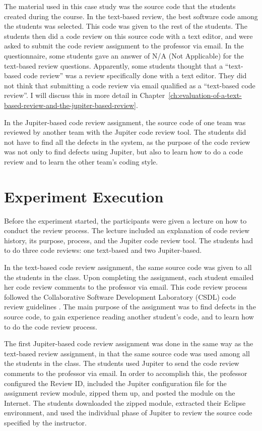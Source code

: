 The material used in this case study was the source code that the students created during the course. In the text-based review, the best software code among the students was selected. This code was given to the rest of the students. The students then did a code review on this source code with a text editor, and were asked to submit the code review assignment to the professor via email. In the questionnaire, some students gave an answer of N/A (Not Applicable) for the text-based review questions. Apparently, some students thought that a ``text-based code review'' was a review specifically done with a text editor.  They did not think that submitting a code review via email qualified as a ``text-based code review''. I will discuss this in more detail in Chapter~\ref{ch:evaluation-of-a-text-based-review-and-the-jupiter-based-review}.

In the Jupiter-based code review assignment, the source code of one team was reviewed by another team with the Jupiter code review tool. The students did not have to find all the defects in the system, as the purpose of the code review was not only to find defects using Jupiter, but also to learn how to do a code review and to learn the other team's coding style.

\section{Experiment Execution}
\label{sec:experiment-execution}

Before the experiment started, the participants were given a lecture on how to conduct the review process. The lecture included an explanation of code review history, its purpose, process, and the Jupiter code review tool. The students had to do three code reviews: one text-based and two Jupiter-based.

In the text-based code review assignment, the same source code was given to all the students in the class. Upon completing the assignment, each student emailed her code review comments to the professor via email. This code review process followed the Collaborative Software Development Laboratory (CSDL) code review guidelines \cite{wiegers:seven}. The main purpose of the assignment was to find defects in the source code, to gain experience reading another student's code, and to learn how to do the code review process.

The first Jupiter-based code review assignment was done in the same way as the text-based review assignment, in that the same source code was used among all the students in the class. The students used Jupiter to send the code review comments to the professor via email. In order to accomplish this, the professor configured the Review ID, included the Jupiter configuration file for the assignment review module, zipped them up, and posted the module on the Internet. The students downloaded the zipped module, extracted their Eclipse environment, and used the individual phase of Jupiter to review the source code specified by the instructor.

